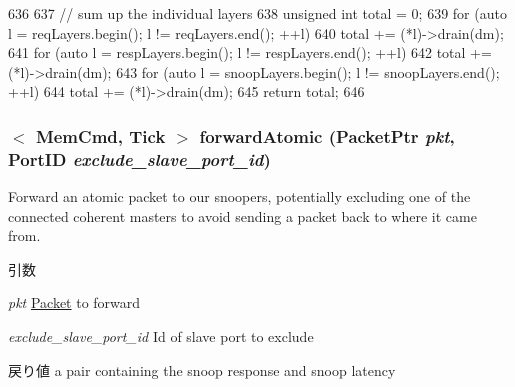 \begin{DoxyCode}
636 {
637     // sum up the individual layers
638     unsigned int total = 0;
639     for (auto l = reqLayers.begin(); l != reqLayers.end(); ++l)
640         total += (*l)->drain(dm);
641     for (auto l = respLayers.begin(); l != respLayers.end(); ++l)
642         total += (*l)->drain(dm);
643     for (auto l = snoopLayers.begin(); l != snoopLayers.end(); ++l)
644         total += (*l)->drain(dm);
645     return total;
646 }
\end{DoxyCode}
\hypertarget{classCoherentBus_aec73b2af9058f907bf2cf6c2773d46ba}{
\subsubsection[{forwardAtomic}]{$<$ {\bf MemCmd}, {\bf Tick} $>$ forwardAtomic ({\bf PacketPtr} {\em pkt}, \/  {\bf PortID} {\em exclude\_\-slave\_\-port\_\-id})}}
\label{classCoherentBus_aec73b2af9058f907bf2cf6c2773d46ba}
Forward an atomic packet to our snoopers, potentially excluding one of the connected coherent masters to avoid sending a packet back to where it came from.


\begin{DoxyParams}{引数}
\item[{\em pkt}]\hyperlink{classPacket}{Packet} to forward \item[{\em exclude\_\-slave\_\-port\_\-id}]Id of slave port to exclude\end{DoxyParams}
\begin{DoxyReturn}{戻り値}
a pair containing the snoop response and snoop latency 
\end{DoxyReturn}



